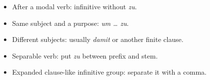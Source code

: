\begin{tcolorbox}[
  colback=referenceBlueBg,
  colframe=genderMasculine,
  title={Quick choice},
  fonttitle=\bfseries
]
\begin{itemize}[leftmargin=*,nosep]
  \item After a modal verb: infinitive without \textit{zu}.
  \item Same subject and a purpose: \textit{um \ldots{} zu}.
  \item Different subjects: usually \textit{damit} or another finite clause.
  \item Separable verb: put \textit{zu} between prefix and stem.
  \item Expanded clause-like infinitive group: separate it with a comma.
\end{itemize}
\end{tcolorbox}
